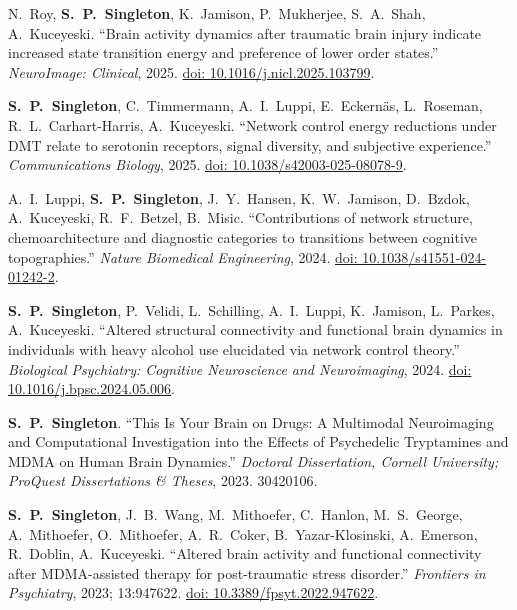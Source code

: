 \documentclass[11pt, letterpaper]{article}
\newcommand{\me}{\textbf{S.\ P.\ Singleton}}
\begin{document}
\begin{etaremune}[itemsep=5pt]
  \item N.\ Roy, \me, K.\ Jamison, P.\ Mukherjee, S.\ A.\ Shah, A.\ Kuceyeski.
    ``Brain activity dynamics after traumatic brain injury indicate increased state transition energy and preference of lower order states.''
    \textit{NeuroImage: Clinical}, 2025.
    \href{https://doi.org/10.1016/j.nicl.2025.103799}{doi: 10.1016/j.nicl.2025.103799}.

  \item \me, C.\ Timmermann, A.\ I.\ Luppi, E.\ Eckern\"{a}s, L.\ Roseman, R.\ L.\ Carhart-Harris, A.\ Kuceyeski.
    ``Network control energy reductions under DMT relate to serotonin receptors, signal diversity, and subjective experience.''
    \textit{Communications Biology}, 2025.
    \href{https://doi.org/10.1038/s42003-025-08078-9}{doi: 10.1038/s42003-025-08078-9}.

  \item A.\ I.\ Luppi, \me, J.\ Y.\ Hansen, K.\ W.\ Jamison, D.\ Bzdok, A.\ Kuceyeski, R.\ F.\ Betzel, B.\ Misic.
    ``Contributions of network structure, chemoarchitecture and diagnostic categories to transitions between cognitive topographies.''
    \textit{Nature Biomedical Engineering}, 2024.
    \href{https://doi.org/10.1038/s41551-024-01242-2}{doi: 10.1038/s41551-024-01242-2}.

  \item \me, P.\ Velidi, L.\ Schilling, A.\ I.\ Luppi, K.\ Jamison, L.\ Parkes, A.\ Kuceyeski.
    ``Altered structural connectivity and functional brain dynamics in individuals with heavy alcohol use elucidated via network control theory.''
    \textit{Biological Psychiatry: Cognitive Neuroscience and Neuroimaging}, 2024.
    \href{https://doi.org/10.1016/j.bpsc.2024.05.006}{doi: 10.1016/j.bpsc.2024.05.006}.

  \item \me.
    ``This Is Your Brain on Drugs: A Multimodal Neuroimaging and Computational Investigation into the Effects of Psychedelic Tryptamines and MDMA on Human Brain Dynamics.''
    \textit{Doctoral Dissertation, Cornell University; ProQuest Dissertations \& Theses}, 2023. 30420106.

  \item \me, J.\ B.\ Wang, M.\ Mithoefer, C.\ Hanlon, M.\ S.\ George, A.\ Mithoefer, O.\ Mithoefer, A.\ R.\ Coker, B.\ Yazar-Klosinski, A.\ Emerson, R.\ Doblin, A.\ Kuceyeski.
    ``Altered brain activity and functional connectivity after MDMA-assisted therapy for post-traumatic stress disorder.''
    \textit{Frontiers in Psychiatry}, 2023; 13:947622.
    \href{https://doi.org/10.3389/fpsyt.2022.947622}{doi: 10.3389/fpsyt.2022.947622}.


\end{etaremune}
\end{document}
